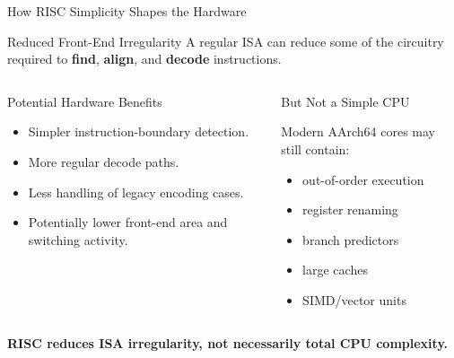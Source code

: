 \documentclass[aspectratio=169,11pt,t]{beamer}
\newcommand{\key}[1]{\textbf{#1}}
\begin{document}
\begin{frame}{How RISC Simplicity Shapes the Hardware}

\vspace{-0.2cm}

\begin{block}{Reduced Front-End Irregularity}
A regular ISA can reduce some of the circuitry
required to \key{find}, \key{align}, and \key{decode}
instructions.
\end{block}

\vspace{-0.2cm}

\begin{columns}[T,onlytextwidth]


\begin{block}{Potential Hardware Benefits}
\begin{itemize}
  \item Simpler instruction-boundary detection.
  \item More regular decode paths.
  \item Less handling of legacy encoding cases.
  \item Potentially lower front-end area
        and switching activity.
\end{itemize}
\end{block}


\begin{block}{But Not a Simple CPU}

Modern AArch64 cores may still contain:

\begin{itemize}
  \item out-of-order execution
  \item register renaming
  \item branch predictors
  \item large caches
  \item SIMD/vector units
\end{itemize}

\end{block}

\end{columns}


\begin{center}
\key{RISC reduces ISA irregularity, not necessarily total CPU complexity.}
\end{center}

\end{frame} 
\end{document}
